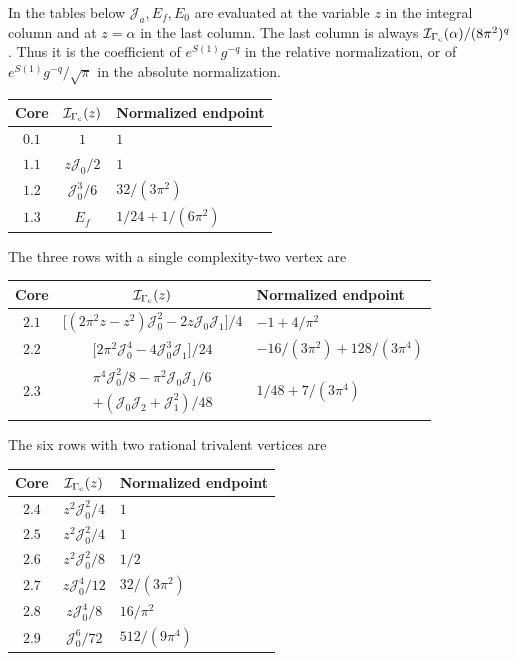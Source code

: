 In the tables below $\mathcal J_a,E_f,E_0$ are evaluated at the
variable $z$ in the integral column and at $z=\alpha$ in the last
column. The last column is always
$\mathcal I_{\Gamma_{\rm c}}(\alpha)/(8\pi^2)^q$. Thus it is the
coefficient of $e^{S(1)}g^{-q}$ in the relative normalization, or of
$e^{S(1)}g^{-q}/\sqrt\pi$ in the absolute normalization.

\begin{center}
\begin{tabular}{ccl}
 Core&$\mathcal I_{\Gamma_{\rm c}}(z)$&Normalized endpoint\\[1mm]\hline
 \noalign{\smallskip}
 $0.1$&$1$&$1$\\[1mm]
 $1.1$&$z\mathcal J_0/2$&$1$\\[1mm]
 $1.2$&$\mathcal J_0^3/6$&$32/(3\pi^2)$\\[1mm]
 $1.3$&$E_f$&$1/24+1/(6\pi^2)$
\end{tabular}
\end{center}

The three rows with a single complexity-two vertex are
\begin{center}
\begin{tabular}{ccl}
 Core&$\mathcal I_{\Gamma_{\rm c}}(z)$&Normalized endpoint\\[1mm]\hline
 \noalign{\smallskip}
 $2.1$&$\bigl[(2\pi^2z-z^2)\mathcal J_0^2
                              -2z\mathcal J_0\mathcal J_1\bigr]/4$
 & $-1+4/\pi^2$\\[2mm]
 $2.2$&$\bigl[2\pi^2\mathcal J_0^4
                         -4\mathcal J_0^3\mathcal J_1\bigr]/24$
 & $-16/(3\pi^2)+128/(3\pi^4)$\\[2mm]
 $2.3$&$\begin{gathered}
 \pi^4\mathcal J_0^2/8-\pi^2\mathcal J_0\mathcal J_1/6\\
              +(\mathcal J_0\mathcal J_2+\mathcal J_1^2)/48
 \end{gathered}$
 & $1/48+7/(3\pi^4)$
\end{tabular}
\end{center}

The six rows with two rational trivalent vertices are
\begin{center}
\begin{tabular}{ccl}
 Core&$\mathcal I_{\Gamma_{\rm c}}(z)$&Normalized endpoint\\[1mm]\hline
 \noalign{\smallskip}
 $2.4$&$z^2\mathcal J_0^2/4$&$1$\\[1mm]
 $2.5$&$z^2\mathcal J_0^2/4$&$1$\\[1mm]
 $2.6$&$z^2\mathcal J_0^2/8$&$1/2$\\[1mm]
 $2.7$&$z\mathcal J_0^4/12$&$32/(3\pi^2)$\\[1mm]
 $2.8$&$z\mathcal J_0^4/8$&$16/\pi^2$\\[1mm]
 $2.9$&$\mathcal J_0^6/72$&$512/(9\pi^4)$
\end{tabular}
\end{center}

